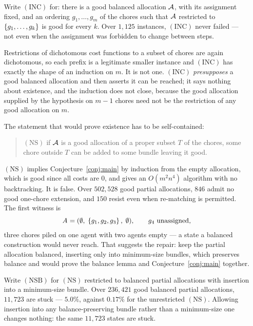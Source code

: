 \begin{proposition}
\label{prop:inc}
Write $(\mathrm{INC})$ for: there is a good balanced allocation $\mathcal{A}$, with its
assignment fixed, and an ordering $g_1,\dots,g_m$ of the chores such that
$\mathcal{A}$ restricted to $\left\{g_1,\dots,g_k\right\}$ is good for every $k$. Over
$1{,}125$ instances, $(\mathrm{INC})$ never failed --- not even when the
assignment was forbidden to change between steps.
\end{proposition}

Restrictions of dichotomous cost functions to a subset of chores are again
dichotomous, so each prefix is a legitimate smaller instance and
$(\mathrm{INC})$ has exactly the shape of an induction on $m$. It is not one.
$(\mathrm{INC})$ \emph{presupposes} a good balanced allocation and then asserts
it can be reached; it says nothing about existence, and the induction does not
close, because the good allocation supplied by the hypothesis on $m-1$ chores
need not be the restriction of any good allocation on $m$.

The statement that would prove existence has to be self-contained:

\begin{quote}
  $(\mathrm{NS})$ \; if $\mathcal{A}$ is a good allocation of a proper subset $T$ of
  the chores, some chore outside $T$ can be added to some bundle leaving it good.
\end{quote}

$(\mathrm{NS})$ implies Conjecture~\ref{conj:main} by induction from the empty
allocation, which is good since all costs are $0$, and gives an $O(m^2n^4)$
algorithm with no backtracking. It is false. Over $502{,}528$ good partial
allocations, $846$ admit no good one-chore extension, and $150$ resist even when
re-matching is permitted. The first witness is
\[
  A_{} = (\emptyset,\; \left\{g_1,g_2,g_3\right\},\; \emptyset),
  \qquad g_4 \text{ unassigned},
\]
three chores piled on one agent with two agents empty --- a state a balanced
construction would never reach. That suggests the repair: keep the partial
allocation balanced, inserting only into minimum-size bundles, which preserves
balance and would prove the balance lemma and Conjecture~\ref{conj:main}
together.

\begin{proposition}
\label{prop:nsb-fails}
Write $(\mathrm{NSB})$ for $(\mathrm{NS})$ restricted to balanced partial
allocations with insertion into a minimum-size bundle. Over $236{,}421$ good
balanced partial allocations, $11{,}723$ are stuck --- $5.0\%$, against $0.17\%$
for the unrestricted $(\mathrm{NS})$. Allowing insertion into any
balance-preserving bundle rather than a minimum-size one changes nothing: the
same $11{,}723$ states are stuck.
\end{proposition}

